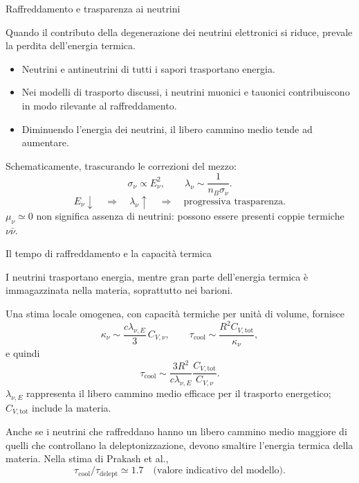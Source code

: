\begin{frame}[t,label=pns-completa-10]{Raffreddamento e trasparenza ai neutrini}
\small\raggedright
Quando il contributo della degenerazione dei neutrini elettronici
si riduce, prevale la perdita dell'energia termica.
\begin{itemize}
 \item Neutrini e antineutrini di tutti i sapori trasportano energia.
 \item Nei modelli di trasporto discussi, i neutrini muonici
 e tauonici contribuiscono in modo rilevante al raffreddamento.
 \item Diminuendo l'energia dei neutrini, il libero cammino medio
 tende ad aumentare.
\end{itemize}
Schematicamente, trascurando le correzioni del mezzo:
\[
 \sigma_\nu\propto E_\nu^2,
 \qquad\lambda_\nu\sim\frac{1}{n_B\sigma_\nu}.
\]
\[
 E_\nu\downarrow\quad\Longrightarrow\quad
 \lambda_\nu\uparrow\quad\Longrightarrow\quad
 \text{progressiva trasparenza}.
\]
$\mu_\nu\simeq0$ non significa assenza di neutrini:
possono essere presenti coppie termiche $\nu\bar\nu$.
\end{frame}

\begin{frame}[t,label=pns-completa-11]{Il tempo di raffreddamento e la capacit\`a termica}
\small\raggedright
I neutrini trasportano energia, mentre gran parte dell'energia
termica \`e immagazzinata nella materia, soprattutto nei barioni.

\medskip
Una stima locale omogenea, con capacit\`a termiche per unit\`a
di volume, fornisce
\[
 \kappa_\nu\sim\frac{c\lambda_{\nu,E}}{3}\,C_{V,\nu},
 \qquad
 \tau_{\mathrm{cool}}\sim\frac{R^2C_{V,\mathrm{tot}}}{\kappa_\nu},
\]
e quindi
\[
 \boxed{\tau_{\mathrm{cool}}\sim
 \frac{3R^2}{c\lambda_{\nu,E}}
 \frac{C_{V,\mathrm{tot}}}{C_{V,\nu}}}.
\]
$\lambda_{\nu,E}$ rappresenta il libero cammino medio efficace
per il trasporto energetico; $C_{V,\mathrm{tot}}$ include la materia.

\medskip
Anche se i neutrini che raffreddano hanno un libero cammino medio
maggiore di quelli che controllano la deleptonizzazione, devono
smaltire l'energia termica della materia.
Nella stima di Prakash et al.,
\[
 \tau_{\mathrm{cool}}/\tau_{\mathrm{delept}}\simeq1.7
 \quad\text{(valore indicativo del modello).}
\]

\end{frame}

